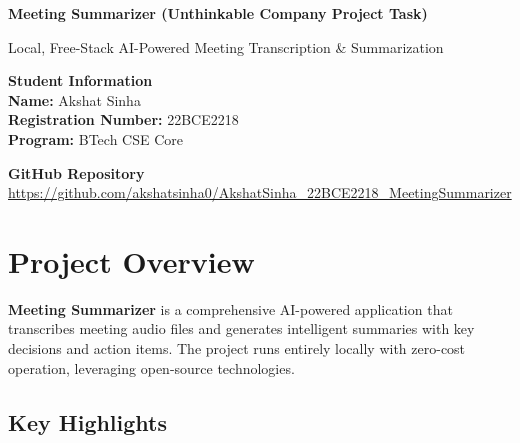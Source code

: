 \documentclass[11pt,a4paper]{article}
\begin{document}
\begin{center}
    {\Huge\bfseries Meeting Summarizer (Unthinkable Company Project Task)}
    
    \vspace{0.3cm}
    {\Large Local, Free-Stack AI-Powered Meeting Transcription \& Summarization}
    
    \vspace{1cm}
    
    \begin{tcolorbox}[colback=lightgray, colframe=darkgray, width=0.8\textwidth]
        \centering
        \textbf{Student Information}\\[0.3cm]
        \textbf{Name:} Akshat Sinha\\
        \textbf{Registration Number:} 22BCE2218\\
        \textbf{Program:} BTech CSE Core
    \end{tcolorbox}
    
    \vspace{1cm}
    
    \begin{tcolorbox}[colback=primaryblue!10, colframe=primaryblue, width=0.8\textwidth]
        \centering
        \textbf{GitHub Repository}\\[0.3cm]
        \url{https://github.com/akshatsinha0/AkshatSinha_22BCE2218_MeetingSummarizer}
    \end{tcolorbox}
\end{center}

\vspace{1cm}

\section*{Project Overview}

\textbf{Meeting Summarizer} is a comprehensive AI-powered application that transcribes meeting audio files and generates intelligent summaries with key decisions and action items. The project runs entirely locally with zero-cost operation, leveraging open-source technologies.

\subsection*{Key Highlights}
\end{document}
